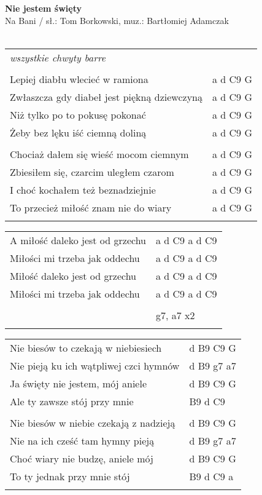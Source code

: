 \documentclass[a5paper]{article}
\begin{document}


\noindent
\fontsize{12pt}{15pt}\selectfont
\textbf{Nie jestem święty} \\
\fontsize{8pt}{10pt}\selectfont
Na Bani / sł.: Tom Borkowski, muz.: Bartłomiej Adamczak\\ \\
\fontsize{10pt}{12pt}\selectfont
{}
\begin{tabular}{@{}p{8.00cm}p{3cm}@{}}
\noindent
\emph{wszystkie chwyty barre} \\ \\

Lepiej diabłu wlecieć w ramiona & a d C9 G \\
Zwłaszcza gdy diabeł jest piękną dziewczyną & a d C9 G \\
Niż tylko po to pokusę pokonać & a d C9 G \\
Żeby bez lęku iść ciemną doliną & a d C9 G \\ \\

Chociaż dałem się wieść mocom ciemnym & a d C9 G \\
Zbiesiłem się, czarcim uległem czarom & a d C9 G \\
I choć kochałem też beznadziejnie & a d C9 G \\
To przecież miłość znam nie do wiary & a d C9 G \\ \\
\end{tabular}

\noindent
\begin{tabular}{@{}p{6.00cm}p{3cm}@{}}
A miłość daleko jest od grzechu & a d C9 a d C9 \\
Miłości mi trzeba jak oddechu & a d C9 a d C9 \\
Miłość daleko jest od grzechu & a d C9 a d C9 \\
Miłości mi trzeba jak oddechu & a d C9 a d C9 \\ \\
& g7, a7 x2 \\ \\
\end{tabular}

\noindent
\begin{tabular}{@{}p{7.00cm}p{3cm}@{}}
Nie biesów to czekają w niebiesiech & d B9 C9 G \\
Nie pieją ku ich wątpliwej czci hymnów & d B9 g7 a7 \\
Ja święty nie jestem, mój aniele & d B9 C9 G \\
Ale ty zawsze stój przy mnie & B9 d C9 \\ \\

Nie biesów w niebie czekają z nadzieją & d B9 C9 G \\
Nie na ich cześć tam hymny pieją & d B9 g7 a7 \\
Choć wiary nie budzę, aniele mój & d B9 C9 G \\
To ty jednak przy mnie stój	& B9 d C9 a \\ \\
\end{tabular}
\end{document}
